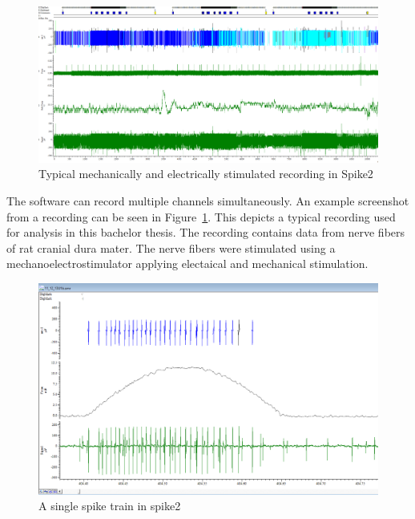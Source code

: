 \begin{figure}
	\includegraphics[width = \textwidth]{src/pic/Spike2_screenshot}
	\caption{Typical mechanically and electrically stimulated recording in Spike2}
	\label{fig:spike2}
\end{figure}

The software can record multiple channels simultaneously. An example screenshot from a recording can be seen in Figure~\ref{fig:spike2}. This depicts a typical recording used for analysis in this bachelor thesis. The recording contains data from nerve fibers of rat cranial dura mater. The nerve fibers were stimulated using a mechanoelectrostimulator applying electaical and mechanical stimulation. 

\begin{figure}
	\includegraphics[width = \textwidth]{src/pic/Spike2_spike_train}
	\caption{A single spike train in spike2}
	\label{fig:spike_train}
\end{figure}

